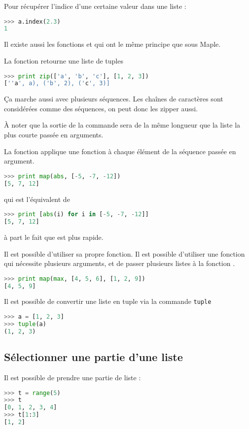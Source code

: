 \documentclass[a4paper,twoside]{article}
\begin{document}
Pour récupérer l'indice d'une certaine valeur dans une liste :
\begin{lstlisting}[language=python]
>>> a.index(2.3)
1
\end{lstlisting}


\bigskip

Il existe aussi les fonctions  et  qui ont le même principe que sous Maple.

La fonction  retourne une liste de tuples
\begin{lstlisting}[language=python]
>>> print zip(['a', 'b', 'c'], [1, 2, 3])
[''a', a), ('b', 2), ('c', 3)]
\end{lstlisting}

\begin{remarque}
Ça marche aussi avec plusieurs séquences. Les chaînes de caractères sont considérées comme des séquences, on peut donc les zipper aussi.

À noter que la sortie de la commande sera de la même longueur que la liste la plus courte passée en arguments.
\end{remarque}

La fonction  applique une fonction à chaque élément de la séquence passée en argument.

\begin{lstlisting}[language=python]
>>> print map(abs, [-5, -7, -12])
[5, 7, 12]
\end{lstlisting}
qui est l'équivalent de
\begin{lstlisting}[language=python]
>>> print [abs(i) for i in [-5, -7, -12]]
[5, 7, 12]
\end{lstlisting}
à part le fait que  est plus rapide.

Il est possible d'utiliser sa propre fonction. Il est possible d'utiliser une fonction qui nécessite plusieurs arguments, et de passer plusieurs listes à la fonction .
\begin{lstlisting}[language=python]
>>> print map(max, [4, 5, 6], [1, 2, 9])
[4, 5, 9]
\end{lstlisting}

\bigskip

Il est possible de convertir une liste en tuple via la commande \texttt{tuple}
\begin{lstlisting}[language=python]
>>> a = [1, 2, 3]
>>> tuple(a)
(1, 2, 3)
\end{lstlisting}

\subsection{Sélectionner une partie d'une liste}
Il est possible de prendre une partie de liste :
\begin{lstlisting}[language=python]
>>> t = range(5)
>>> t
[0, 1, 2, 3, 4]
>>> t[1:3]
[1, 2]
\end{lstlisting}
\end{document}
